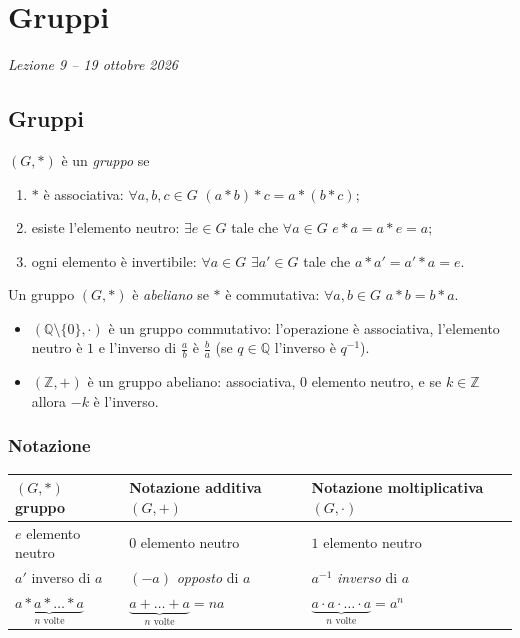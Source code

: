 \documentclass[11pt,a4paper]{article}
\begin{document}
\section[Gruppi (Lezione 9 -- 19 ottobre 2026)]{Gruppi}
\noindent\emph{Lezione 9 -- 19 ottobre 2026}
\subsection{Gruppi}

\begin{definizione}
$(G, *)$ è un \emph{gruppo} se
\begin{enumerate}
  \item $*$ è associativa: $\forall a, b, c \in G$ \quad $(a * b) * c = a * (b * c)$;
  \item esiste l'elemento neutro: $\exists e \in G$ tale che $\forall a \in G$ \quad $e * a = a * e = a$;
  \item ogni elemento è invertibile: $\forall a \in G$ \quad $\exists a' \in G$ tale che $a * a' = a' * a = e$.
\end{enumerate}
Un gruppo $(G, *)$ è \emph{abeliano} se $*$ è commutativa: $\forall a, b \in G$ \quad $a * b = b * a$.
\end{definizione}

\begin{esempio}
\begin{itemize}
  \item $(\mathbb{Q}\setminus\{0\}, \cdot)$ è un gruppo commutativo: l'operazione è associativa, l'elemento neutro è $1$ e l'inverso di $\frac{a}{b}$ è $\frac{b}{a}$ (se $q \in \mathbb{Q}$ l'inverso è $q^{-1}$).
  \item $(\mathbb{Z}, +)$ è un gruppo abeliano: associativa, $0$ elemento neutro, e se $k \in \mathbb{Z}$ allora $-k$ è l'inverso.
\end{itemize}
\end{esempio}

\subsubsection{Notazione}

\begin{center}
\begin{tabular}{@{}p{3.5cm} p{4.5cm} p{4.5cm}@{}}
\toprule
$(G, *)$ gruppo & Notazione additiva $(G, +)$ & Notazione moltiplicativa $(G, \cdot)$ \\
\midrule
$e$ elemento neutro & $0$ elemento neutro & $1$ elemento neutro \\[2pt]
$a'$ inverso di $a$ & $(-a)$ \emph{opposto} di $a$ & $a^{-1}$ \emph{inverso} di $a$ \\[2pt]
$\underbrace{a * a * \dots * a}_{n\text{ volte}}$ & $\underbrace{a + \dots + a}_{n\text{ volte}} = na$ & $\underbrace{a \cdot a \cdot \ldots \cdot a}_{n\text{ volte}} = a^n$ \\
\bottomrule
\end{tabular}
\end{center}
\end{document}
